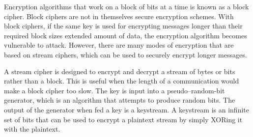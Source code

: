 Encryption algorithms that work on a block of bits at a time is known as a block cipher.
Block ciphers are not in themselves secure encryption schemes.
With block ciphers, if the same key is used for encrypting messages longer than their required block sizes extended amount of data, the encryption algorithm becomes vulnerable to attack.
However, there are many modes of encryption that are based on stream ciphers, which can be used to securely encrypt longer messages.

A stream cipher is designed to encrypt and decrypt a stream of bytes or bits rather than a block.
This is useful when the length of a communication would make a block cipher too slow.
The key is input into a pseudo–random-bit generator, which is an algorithm that attempts to produce random bits.
The output of the generator when fed a key is a keystream.
A keystream is an infinite set of bits that can be used to encrypt a plaintext stream by simply XORing it with the plaintext.


